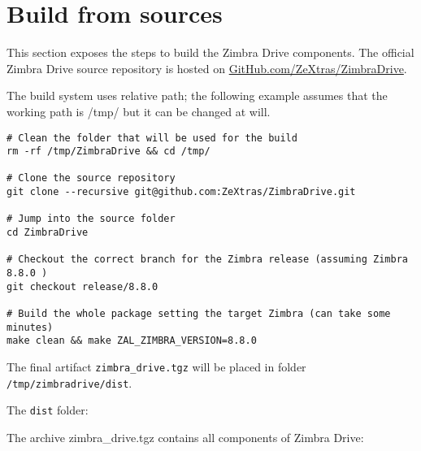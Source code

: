 \section{Build from sources}
This section exposes the steps to build the Zimbra Drive components.
The official Zimbra Drive source repository is hosted on \href{https://github.com/ZeXtras/ZimbraDrive}{GitHub.com/ZeXtras/ZimbraDrive}.

The build system uses relative path; the following example assumes that the working path is /tmp/
but it can be changed at will.
\begin{verbatim}
# Clean the folder that will be used for the build
rm -rf /tmp/ZimbraDrive && cd /tmp/

# Clone the source repository
git clone --recursive git@github.com:ZeXtras/ZimbraDrive.git

# Jump into the source folder
cd ZimbraDrive

# Checkout the correct branch for the Zimbra release (assuming Zimbra 8.8.0 )
git checkout release/8.8.0

# Build the whole package setting the target Zimbra (can take some minutes)
make clean && make ZAL_ZIMBRA_VERSION=8.8.0
\end{verbatim}

The final artifact \texttt{zimbra\_drive.tgz} will be placed in folder \texttt{/tmp/zimbradrive/dist}.

The \texttt{dist} folder:

The archive zimbra\_drive.tgz contains all components of Zimbra Drive:

